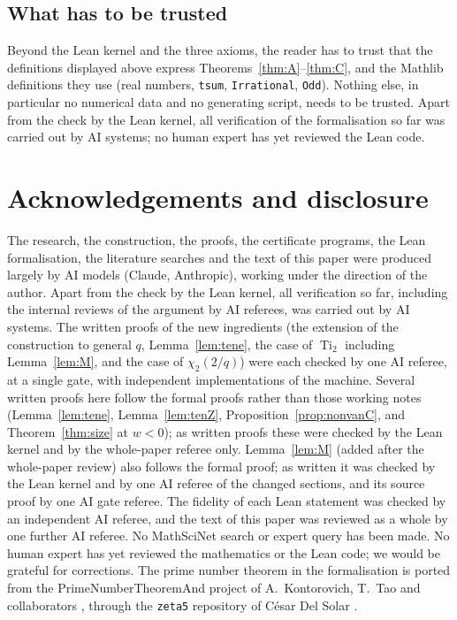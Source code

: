 \documentclass[11pt]{amsart}
\theoremstyle{definition}
\theoremstyle{remark}
\numberwithin{equation}{section}
\newcommand{\Ti}{\operatorname{Ti}}
\newcommand{\lean}[1]{{\def\_{\textunderscore\allowbreak}\texttt{#1}}}
\begin{document}
\subsection{What has to be trusted}
Beyond the Lean kernel and the three axioms, the reader has to trust that the definitions displayed above express
Theorems~\ref{thm:A}--\ref{thm:C}, and the Mathlib definitions they use (real numbers, \lean{tsum}, \lean{Irrational},
\lean{Odd}). Nothing else, in particular no numerical data and no generating script, needs to be trusted. Apart from the
check by the Lean kernel, all verification of the formalisation so far was carried out by AI systems; no human expert has
yet reviewed the Lean code.

\section*{Acknowledgements and disclosure}
The research, the construction, the proofs, the certificate programs, the Lean formalisation, the literature searches and
the text of this paper were produced largely by AI models (Claude, Anthropic), working under the direction of the author.
Apart from the check by the Lean kernel, all verification so far, including the internal reviews of the argument by AI
referees, was carried out by AI systems. The written proofs of the new ingredients (the extension of the construction to
general $q$, Lemma~\ref{lem:tene}, the case of $\Ti_2$ including Lemma~\ref{lem:M}, and the case of $\chi_2(2/q)$) were
each checked by one AI referee,
at a single gate, with independent implementations of the machine. Several written proofs here follow the formal proofs
rather than those working notes (Lemma~\ref{lem:tene}, Lemma~\ref{lem:tenZ},
Proposition~\ref{prop:nonvanC}, and Theorem~\ref{thm:size} at $w<0$); as written proofs these were checked by the Lean kernel and by the whole-paper referee
only. Lemma~\ref{lem:M} (added after the whole-paper review) also follows the formal proof; as written it was checked by
the Lean kernel and by one AI referee of the changed sections, and its source proof by one AI gate referee. The fidelity of each Lean statement was checked by an independent AI referee, and the text of this paper was
reviewed as a whole by one further AI referee. No MathSciNet
search or expert query has been made. No human expert has yet reviewed the mathematics or the Lean code; we would be
grateful for corrections. The prime number theorem in the formalisation is ported from the PrimeNumberTheoremAnd project of
A.~Kontorovich, T.~Tao and collaborators \cite{PNTplus}, through the \lean{zeta5} repository of C\'esar Del Solar
\cite{zeta5}.



\end{document}
